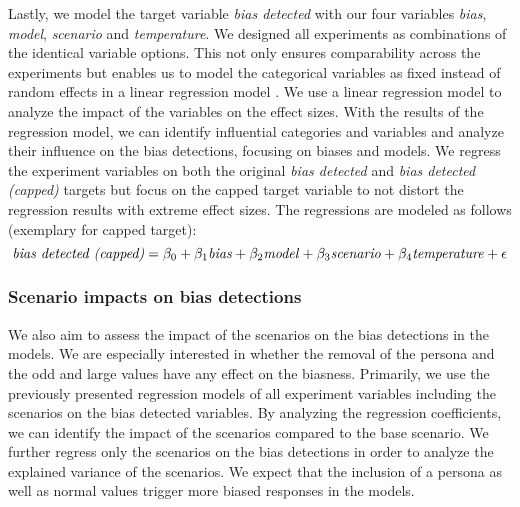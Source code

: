 \par Lastly, we model the target variable \textit{bias detected} with our four variables \textit{bias}, \textit{model}, \textit{scenario} and \textit{temperature}. We designed all experiments as combinations of the identical variable options. This not only ensures comparability across the experiments but enables us to model the categorical variables as fixed instead of random effects in a linear regression model \parencite{borenstein2021introduction, cooper2019handbook, nakagawa2023quantitative}. We use a linear regression model to analyze the impact of the variables on the effect sizes. With the results of the regression model, we can identify influential categories and variables and analyze their influence on the bias detections, focusing on biases and models. We regress the experiment variables on both the original \textit{bias detected} and \textit{bias detected (capped)} targets but focus on the capped target variable to not distort the regression results with extreme effect sizes. The regressions are modeled as follows (exemplary for capped target):
\begin{equation} \label{eq:general_regression_capped}
    \text{\textit{bias detected (capped)}} = \beta_0 + \beta_1 \text{\textit{bias}} + \beta_2 \text{\textit{model}} + \beta_3 \text{\textit{scenario}} + \beta_4 \text{\textit{temperature}} + \epsilon
\end{equation}


\subsubsection{Scenario impacts on bias detections}
\par We also aim to assess the impact of the scenarios on the bias detections in the models. We are especially interested in whether the removal of the persona and the odd and large values have any effect on the biasness. Primarily, we use the previously presented regression models of all experiment variables including the scenarios on the bias detected variables. By analyzing the regression coefficients, we can identify the impact of the scenarios compared to the base scenario. We further regress only the scenarios on the bias detections in order to analyze the explained variance of the scenarios. We expect that the inclusion of a persona as well as normal values trigger more biased responses in the models.

